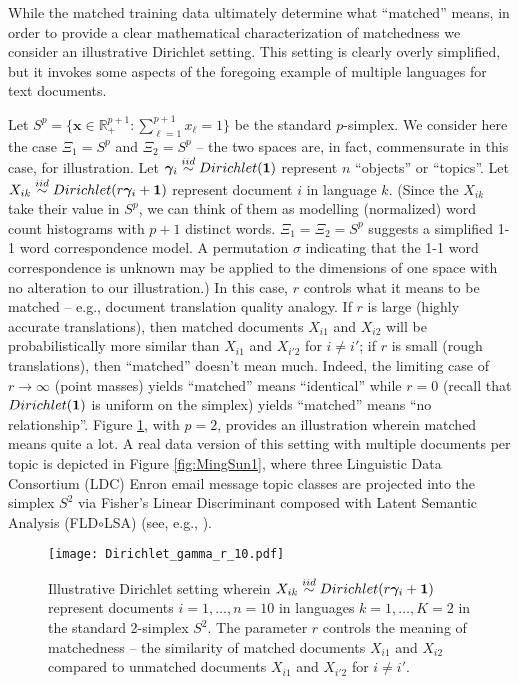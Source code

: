 \documentclass[12pt,xcolor]{article}
\newcommand{\1}{\ensuremath{\mbox{{\bf 1}}}}
\newcommand{\iid}{\stackrel{iid}{\sim}}
\begin{document}
While the matched training data ultimately determine what ``matched'' means,
in order to provide a clear mathematical characterization of matchedness
we consider an illustrative Dirichlet setting.
This setting is clearly overly simplified, but it invokes some aspects of
the foregoing example of multiple languages for text documents.

  Let
  $S^p =\{\bm{x} \in \mathbb{R}^{p+1}_+: \sum_{\ell=1}^{p+1} x_{\ell} = 1\}$
  be the standard $p$-simplex.
  We consider here the case $\Xi_1 = S^p$ and $\Xi_2 = S^p$ --
   the two spaces are, in fact, commensurate in this case, for illustration.
   Let $\bm{\gamma}_i \iid Dirichlet(\1)$ represent $n$ ``objects'' or ``topics''.
   Let $X_{ik} \iid Dirichlet(r\bm{\gamma}_i+\1)$ represent document $i$ in language $k$.
  (Since the $X_{ik}$ take their value in $S^p$, we can think of them as modelling
  (normalized) word count histograms with $p+1$ distinct words.
  $\Xi_1 = \Xi_2 = S^p$ suggests a simplified 1-1 word correspondence model.
  A permutation $\sigma$
  indicating that the 1-1 word correspondence is unknown
  may be applied to the dimensions of one space
  with no alteration to our illustration.)
In this case, $r$ controls what it means to be matched
-- e.g., document translation quality analogy.
If $r$ is large (highly accurate translations), then matched documents $X_{i1}$ and $X_{i2}$
will be probabilistically more similar than $X_{i1}$ and $X_{i'2}$ for $i \neq i'$;
if $r$ is small (rough translations), then ``matched'' doesn't mean much.
Indeed, the limiting case of $r \to \infty$ (point masses) yields ``matched'' means ``identical''
while $r=0$ (recall that $Dirichlet(\1)$ is uniform on the simplex) yields ``matched'' means ``no relationship''.
  Figure \ref{fig:dirichlet}, with $p=2$, provides an illustration wherein matched means quite a lot.
A real data version of this setting with multiple documents per topic
is depicted in Figure \ref{fig:MingSun1},
where three Linguistic Data Consortium (LDC) Enron email message topic classes
are projected into the simplex $S^2$ via
Fisher's Linear Discriminant composed with Latent Semantic Analysis (FLD$\circ$LSA)
(see, e.g., \cite{Berry_2003,Berry_2007,TextMining}).

  \begin{figure}[h]
    \begin{center}
      \texttt{[image: Dirichlet\_gamma\_r\_10.pdf]}
    \caption{Illustrative Dirichlet setting wherein
    $X_{ik} \iid Dirichlet(r\bm{\gamma}_i+\1)$ represent documents $i=1,\ldots,n=10$ in languages $k=1,\ldots,K=2$ in the standard 2-simplex $S^2$.
  The parameter $r$ controls the meaning of matchedness --
the similarity of matched documents $X_{i1}$ and $X_{i2}$
compared to unmatched documents $X_{i1}$ and $X_{i'2}$ for $i \neq i'$.
    }\label{fig:dirichlet}
  \end{center}
\end{figure}
\end{document}
